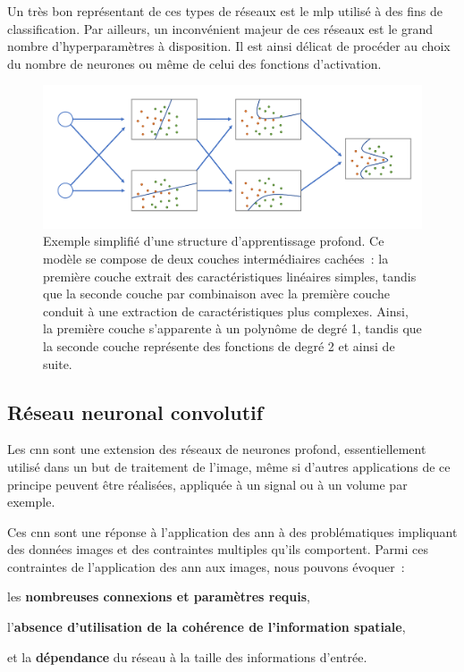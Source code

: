 Un très bon représentant de ces types de réseaux est le \gls{mlp} utilisé à des fins de classification. Par ailleurs, un inconvénient majeur de ces réseaux est le grand nombre d'hyperparamètres à disposition. Il est ainsi délicat de procéder au choix du nombre de neurones ou même de celui des fonctions d'activation.\par

\addtocounter{footnote}{1}

\begin{figure}[H]
    \centering
    \includegraphics[width=\linewidth]{contents/chapter_3/resources/scheme_deep_understanding.pdf}
    \caption{Exemple simplifié d'une structure d’apprentissage profond. Ce modèle se compose de deux couches intermédiaires cachées~: la première couche extrait des caractéristiques linéaires simples, tandis que la seconde couche par combinaison avec la première couche conduit à une extraction de caractéristiques plus complexes. Ainsi, la première couche s'apparente à un polynôme de degré 1, tandis que la seconde couche représente des fonctions de degré 2 et ainsi de suite.}
    \label{fig:scheme_deep_understanding}
\end{figure}

\subsection{Réseau neuronal convolutif}
\label{sec:convolutionnal_neural_network}
Les \gls{cnn} sont une extension des réseaux de neurones profond, essentiellement utilisé dans un but de traitement de l'image, même si d'autres applications de ce principe peuvent être réalisées, appliquée à un signal ou à un volume par exemple.\par

Ces \gls{cnn} sont une réponse à l'application des \gls{ann} à des problématiques impliquant des données images et des contraintes multiples qu'ils comportent. Parmi ces contraintes de l'application des \gls{ann} aux images, nous pouvons évoquer~: 
\begin{inlinerate}
\item les \textbf{nombreuses connexions et paramètres requis},
\item l'\textbf{absence d'utilisation de la cohérence de l'information spatiale},
\item et la \textbf{dépendance} du réseau à la taille des informations d'entrée.
\end{inlinerate}\par


